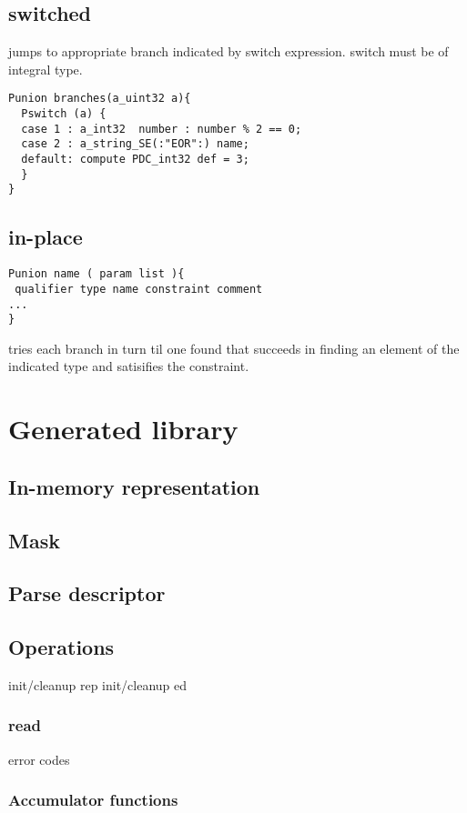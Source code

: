 \subsection{switched}
jumps to appropriate branch indicated by switch expression.
switch must be of integral type. 
\begin{verbatim}
Punion branches(a_uint32 a){
  Pswitch (a) {
  case 1 : a_int32  number : number % 2 == 0;
  case 2 : a_string_SE(:"EOR":) name;
  default: compute PDC_int32 def = 3; 
  }
}
\end{verbatim}

\subsection{in-place}
\begin{verbatim}
Punion name ( param list ){
 qualifier type name constraint comment
...
}
\end{verbatim}
tries each branch in turn til one found that succeeds in finding an
element of the indicated type and satisifies the constraint.


\section{Generated library}
\subsection{In-memory representation}
\label{sec:unions-rep}
\subsection{Mask}
\label{sec:unions-masks}
\subsection{Parse descriptor}
\label{sec:unions-parse-descriptors}
\subsection{Operations}
init/cleanup rep
init/cleanup ed
\subsubsection{read}
  error codes
\subsubsection{Accumulator functions}


